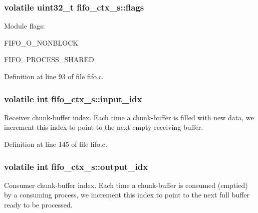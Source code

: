 \subsubsection[{\texorpdfstring{flags}{flags}}]{\setlength{\rightskip}{0pt plus 5cm}volatile uint32\+\_\+t fifo\+\_\+ctx\+\_\+s\+::flags}\hypertarget{structfifo__ctx__s_a6c86ce21bbd7a84d164d9c5ecf72ac3a}{}\label{structfifo__ctx__s_a6c86ce21bbd7a84d164d9c5ecf72ac3a}
Module flags\+:
\begin{DoxyItemize}
\item F\+I\+F\+O\+\_\+\+O\+\_\+\+N\+O\+N\+B\+L\+O\+CK
\item F\+I\+F\+O\+\_\+\+P\+R\+O\+C\+E\+S\+S\+\_\+\+S\+H\+A\+R\+ED 
\end{DoxyItemize}

Definition at line 93 of file fifo.\+c.

\subsubsection[{\texorpdfstring{input\+\_\+idx}{input_idx}}]{\setlength{\rightskip}{0pt plus 5cm}volatile int fifo\+\_\+ctx\+\_\+s\+::input\+\_\+idx}\hypertarget{structfifo__ctx__s_aa5c17b3a497d655710243cb2c14ef1bf}{}\label{structfifo__ctx__s_aa5c17b3a497d655710243cb2c14ef1bf}
Receiver chunk-\/buffer index. Each time a chunk-\/buffer is filled with new data, we increment this index to point to the next empty receiving buffer. 

Definition at line 145 of file fifo.\+c.

\subsubsection[{\texorpdfstring{output\+\_\+idx}{output_idx}}]{\setlength{\rightskip}{0pt plus 5cm}volatile int fifo\+\_\+ctx\+\_\+s\+::output\+\_\+idx}\hypertarget{structfifo__ctx__s_a28fca425f183a3add55c94dcdc5c04e0}{}\label{structfifo__ctx__s_a28fca425f183a3add55c94dcdc5c04e0}
Consumer chunk-\/buffer index. Each time a chunk-\/buffer is consumed (emptied) by a consuming process, we increment this index to point to the next full buffer ready to be processed. 

